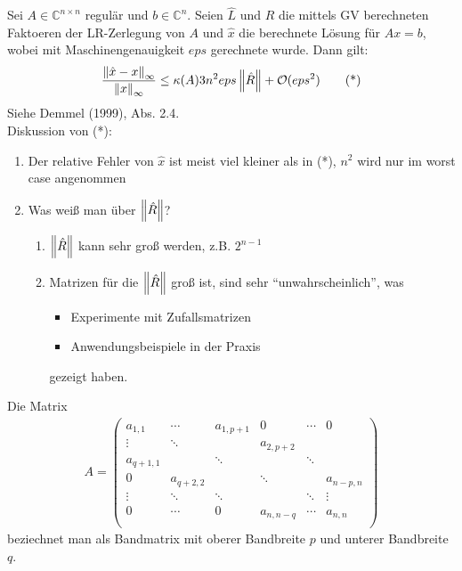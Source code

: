 \satz Sei $A \in \mathbb{C}^{n \times n}$ regulär und $b \in \mathbb{C}^n$. Seien $\hat{L}$ und $\hat{R}$ die mittels GV
berechneten Faktoeren der LR-Zerlegung von $A$ und $\hat{x}$ die berechnete Lösung für $Ax = b$, wobei mit
Maschinengenauigkeit $eps$ gerechnete wurde. Dann gilt:
\begin{align*}
  \frac{\left\lVert \hat{x}-x \right\rVert_\infty}{\left\lVert x \right\rVert_\infty} \leq \kappa(A) 3n^2 eps \left\lVert \hat{R} \right\rVert + \mathcal{O}(eps^2) \tag{*}
\end{align*}
\beweis Siehe Demmel (1999), Abs. 2.4.\\
Diskussion von (*):
\begin{enumerate}
  \item Der relative Fehler von $\hat{x}$ ist meist viel kleiner als in (*), $n^2$ wird nur im worst case angenommen
  \item Was weiß man über $\left\lVert \hat{R} \right\rVert$?
    \begin{enumerate}[i]
      \item $\left\lVert \hat{R} \right\rVert$ kann sehr groß werden, z.B. $2^{n-1}$
      \item Matrizen für die $\left\lVert \hat{R} \right\rVert$ groß ist, sind sehr ``unwahrscheinlich'', was
        \begin{itemize}
          \item Experimente mit Zufallsmatrizen
          \item Anwendungsbeispiele in der Praxis
        \end{itemize}
        gezeigt haben.
    \end{enumerate}
\end{enumerate}
 Die Matrix
\begin{align*}
  A = \begin{pmatrix}
    a_{1,1} & \cdots & a_{1,p+1} & 0         & \cdots & 0\\
    \vdots  & \ddots &           & a_{2,p+2} & & \\
    a_{q+1,1} &      & \ddots    &           & \ddots & \\
    0       & a_{q+2,2} &        & \ddots    & & a_{n-p,n} \\
    \vdots  & \ddots & \ddots    &           & \ddots & \vdots \\
    0       & \cdots & 0         & a_{n,n-q} & \cdots & a_{n,n} \\
  \end{pmatrix}
\end{align*}
beziechnet man als Bandmatrix mit oberer Bandbreite $p$ und unterer Bandbreite $q$.

